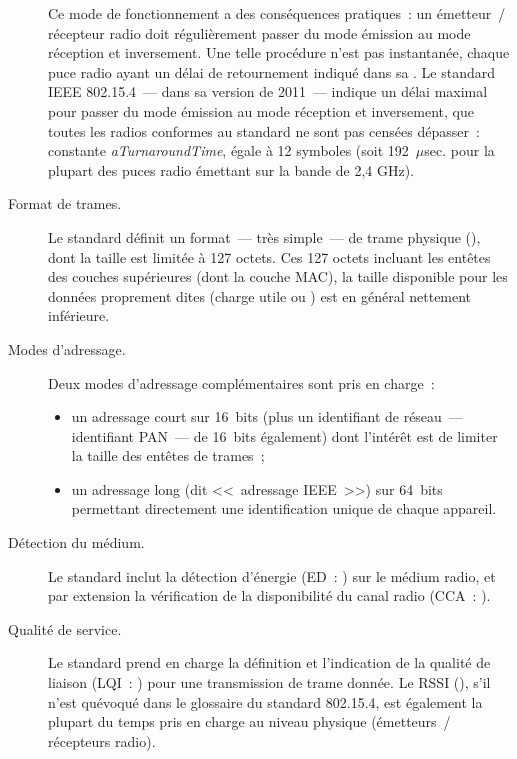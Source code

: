 \begin{description}
Ce mode de fonctionnement  a des conséquences pratiques~:
un émetteur~/ récepteur radio doit régulièrement passer du mode émission
au mode réception et inversement. Une telle procédure n'est pas instantanée,
chaque puce radio ayant un délai de retournement indiqué dans sa
. Le standard IEEE 802.15.4~--- dans sa version de 2011~---
indique un délai maximal pour passer du mode émission au mode réception et
inversement, que toutes les radios conformes au standard ne sont pas censées
dépasser~: constante \emph{aTurnaroundTime}, égale à 12 symboles (soit
192~$\mu$sec. pour la plupart des puces radio émettant sur la bande
de 2,4 GHz).

\item[Format de trames.]
Le standard définit un format~--- très simple~--- de trame physique
(), dont la taille est limitée à 127 octets.
Ces 127 octets incluant les entêtes des couches supérieures (dont la
couche MAC), la taille disponible pour les données proprement dites
(charge utile ou ) est en général nettement inférieure.

\item[Modes d'adressage.]
Deux modes d'adressage complémentaires sont pris en charge~:
\begin{itemize}
\item un adressage court sur 16~bits (plus un identifiant de réseau~---
identifiant PAN~--- de 16~bits également) dont l'intérêt est de limiter
la taille des entêtes de trames~;
\item un adressage long (dit <<~adressage IEEE~>>) sur 64~bits permettant
 directement une identification unique de chaque appareil.
\end{itemize}

\item[Détection du médium.]
Le standard inclut la détection d'énergie (ED~: )
sur le médium radio, et par extension la vérification de la disponibilité
du canal radio (CCA~: ).

\item[Qualité de service.]
Le standard prend en charge la définition et l'indication de la qualité
de liaison (LQI~: ) pour une transmission
de trame donnée. Le RSSI (),
s'il n'est quévoqué dans le glossaire du standard 802.15.4, est également
la plupart du temps pris en charge au niveau physique (émetteurs~/
récepteurs radio).

\end{description}

